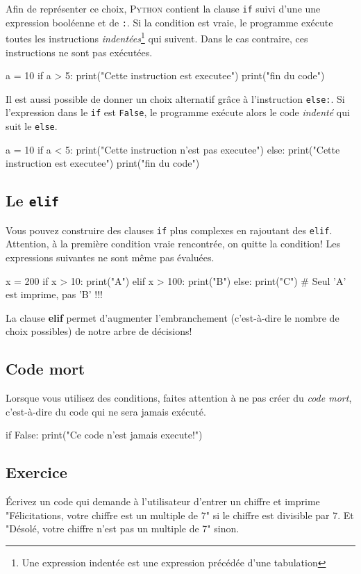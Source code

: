 Afin de représenter ce choix, \textsc{Python} contient la clause \texttt{if} suivi d'une une expression booléenne et de \texttt{:}. Si la condition est vraie, le programme exécute toutes les instructions \textit{indentées}\footnote{Une expression indentée est une expression précédée d'une tabulation} qui suivent. Dans le cas contraire, ces instructions ne sont pas exécutées.

\begin{python}[caption = l'instruction if]
a = 10
if a > 5:
    print("Cette instruction est executee")
print("fin du code")
\end{python}
Il est aussi possible de donner un choix alternatif grâce à l'instruction \texttt{else:}. Si l'expression dans le \texttt{if} est \texttt{False}, le programme exécute alors le code \textit{indenté} qui suit le \texttt{else}.
\begin{python}
a = 10
if a < 5:
    print("Cette instruction n'est pas executee")
else:
    print("Cette instruction est executee")
print("fin du code")
\end{python}

\subsection{Le \texttt{elif}}
Vous pouvez construire des clauses \texttt{if} plus complexes en rajoutant des \texttt{elif}. Attention, à la première condition vraie rencontrée, on quitte la condition! Les expressions suivantes ne sont même pas évaluées.

\begin{python}[caption = utilisation de elif]
x = 200
if x > 10:
    print("A")
elif x > 100:
    print("B")
else:
    print("C")
# Seul 'A' est imprime, pas 'B' !!!
\end{python}
La clause \textbf{elif} permet d'augmenter l'embranchement 
(c'est-à-dire le nombre de choix possibles) de notre arbre de décisions!

\subsection{Code mort}

Lorsque vous utilisez des conditions, faites attention à ne pas créer du \textit{code mort}, c'est-à-dire du code qui ne sera jamais exécuté.
\begin{python}[caption = Exemple de code mort]
if False:
    print("Ce code n'est jamais execute!")
\end{python}

\subsection{Exercice}
Écrivez un code qui demande à l'utilisateur d'entrer un chiffre et imprime "Félicitations, votre chiffre est un multiple de 7" si le chiffre est divisible par 7. Et "Désolé, votre chiffre n'est pas un multiple de 7" sinon.
